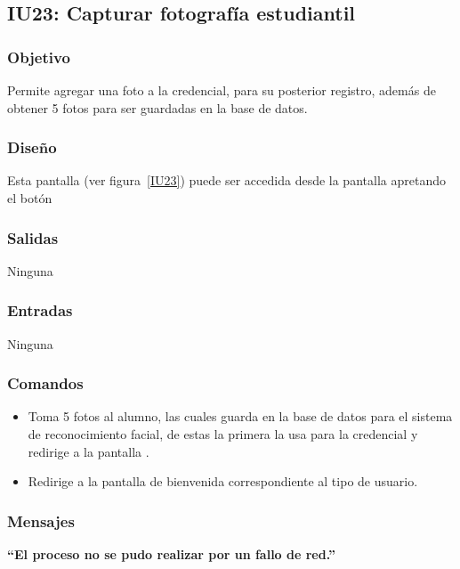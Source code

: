 
\subsection{IU23: Capturar fotografía estudiantil}

\subsubsection{Objetivo}
   Permite agregar una foto a la credencial, para su posterior registro, además de obtener 5 fotos para ser guardadas en la base de datos.
\subsubsection{Diseño}
    Esta pantalla  (ver figura~\ref{IU23}) puede ser accedida desde la pantalla  apretando el botón 


\subsubsection{Salidas}
Ninguna
\subsubsection{Entradas}
Ninguna
\subsubsection{Comandos}
\begin{itemize}
    \item {} Toma 5 fotos al alumno, las cuales guarda en la base de datos para el sistema de reconocimiento facial, de estas la primera la usa para la credencial y redirige a la pantalla .
    \item {} Redirige a la pantalla de bienvenida correspondiente al tipo de usuario.
    
\end{itemize}

\subsubsection{Mensajes}

\begin{Citemize}
    \item {\bf  ``El proceso no se pudo realizar por un fallo de red.''}
\end{Citemize}

